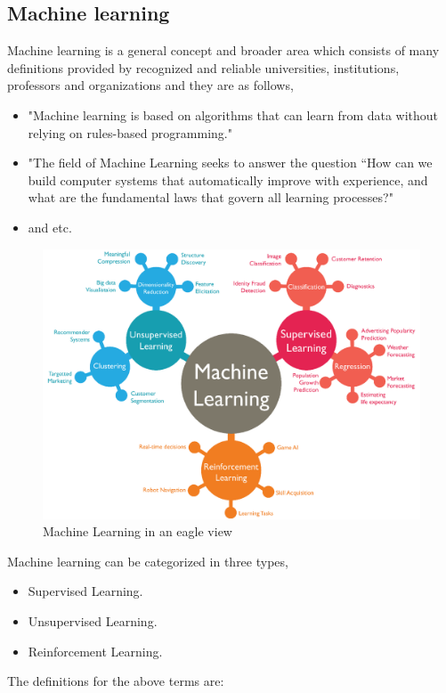 \documentclass[format=sigconf]{acmart}
\begin{document}
\subsection{Machine learning}
Machine learning is a general concept and broader area which consists of many definitions provided by recognized and reliable 
universities, institutions, professors and organizations and they are as follows,
\begin{itemize}
    \item "Machine learning is based on algorithms that can learn from data without relying on rules-based programming." \cite{machineLearning1}
    \item "The field of Machine Learning seeks to answer the question “How can we build computer systems that automatically 
           improve with experience, and what are the fundamental laws that govern all learning processes?" \cite{machineLearning2}
    \item and etc.
\end{itemize}
\begin{figure}[H]
    \centering
    \includegraphics[scale=0.70]{images/Machine_Learning.png}
    \caption{Machine Learning in an eagle view}
    \label{fig:ml}
\end{figure}
Machine learning can be categorized in three types,
\begin{itemize}
    \item Supervised Learning.
    \item Unsupervised Learning.
    \item Reinforcement Learning.
\end{itemize}
The definitions for the above terms are:
\end{document}
